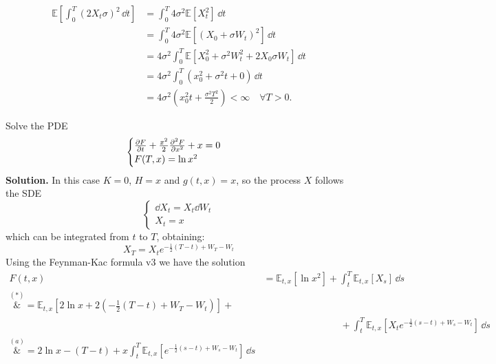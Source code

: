\begin{example}{}{}{}
    \begin{align*}
        \mathbb{E}\left[\int^T_0 (2X_t\sigma)^2\,\dd t\right] &= \int^T_0 4\sigma^2\mathbb{E}[X_t^2]\,\dd t \\
        &= 
        \int^T_0 4\sigma^2\mathbb{E}[(X_0+\sigma W_t)^2]\,\dd t \\
        &=
        4\sigma^2 \int^T_0 \mathbb{E}[X_0^2+\sigma^2 W_t^2 + 2X_0\sigma W_t]\,\dd t \\
        &=
        4\sigma^2 \int^T_0 (x_0^2+\sigma^2 t + 0)\,\dd t \\
        &=
        4\sigma^2\left(x_0^2 t +\frac{\sigma^2 T^2}{2}\right) < \infty \quad \forall T>0.
    \end{align*}
\end{example}
\begin{example}{}{}{}
    Solve the PDE
    \begin{equation*}
        \begin{cases}
        \pdv{F}{t}(t,x) + \frac{x^2}{2}\pdv[2]{F}{x}(t,x) + x = 0\\
        F(T,x) = \ln x^2
        \end{cases}
    \end{equation*}
    \textbf{Solution.} In this case $K=0$, $H=x$ and $g(t,x)=x$, so the process $X$ follows the SDE
    \begin{equation*}
        \begin{cases}
        \dd X_t = X_t\dd W_t\\
        X_t = x
        \end{cases}
    \end{equation*}
    which can be integrated from $t$ to $T$, obtaining:
    \begin{equation}\label{lin}
        X_T = X_t e^{-\frac{1}{2}(T-t)+W_T-W_t} \tag{$\star$}
    \end{equation}
    Using the Feynman-Kac formula v3 we have the solution
    \begin{align*}
        F(t,x) &= \mathbb{E}_{t,x}[\ln x^2] + \int_t^T \mathbb{E}_{t,x}[X_s]\,\dd s \\
        \overset{(*)}&{=} 
        \mathbb{E}_{t,x}\left[2\ln x + 2\left(-\frac{1}{2}(T-t)+W_T-W_t\right)\right] +\\
        &\qquad\qquad\qquad\qquad + \int_t^T \mathbb{E}_{t,x}[X_t e^{-\frac{1}{2}(s-t)+W_s-W_t}]\,\dd s \\
        \overset{(a)}&{=}
        2\ln x - (T-t) + x\int^T_t \mathbb{E}_{t,x}\left[e^{-\frac{1}{2}(s-t)+W_s-W_t}\right] \,\dd s \\

\end{align*}
\end{example}
